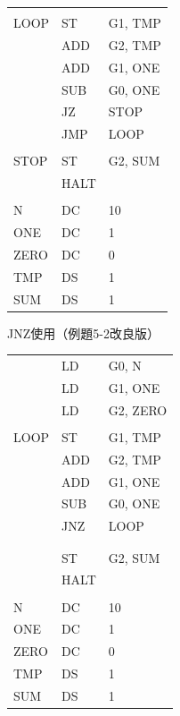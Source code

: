 \documentclass[handout]{beamer}        %
\begin{document}
\begin{frame}
\begin{minipage}{0.36\columnwidth}
{\begin{tabular}{|l|l|l|}
              &        &          \\
      LOOP    & ST     & G1, TMP  \\
              & ADD    & G2, TMP  \\
              & ADD    & G1, ONE  \\
              & SUB    & G0, ONE  \\
              & JZ     & STOP     \\
              & JMP    & LOOP     \\
              &        &          \\
      STOP    & ST     & G2, SUM  \\
              & HALT   &          \\
              &        &          \\
      N       & DC     & 10       \\
      ONE     & DC     & 1        \\
      ZERO    & DC     & 0        \\
      TMP     & DS     & 1        \\
      SUM     & DS     & 1        \\
    \end{tabular}}
  \end{minipage}
  \begin{minipage}{0.36\columnwidth}
    {\ttfamily JNZ使用（例題5-2改良版）\\\scriptsize
      \begin{tabular}{|l|l|l|}
              & LD     & G0, N    \\
              & LD     & G1, ONE  \\
              & LD     & G2, ZERO \\
              &        &          \\
      LOOP    & ST     & G1, TMP  \\
              & ADD    & G2, TMP  \\
              & ADD    & G1, ONE  \\
              & SUB    & G0, ONE  \\
              & JNZ    & LOOP     \\
              &        &          \\
              &        &          \\
              & ST     & G2, SUM  \\
              & HALT   &          \\
              &        &          \\
      N       & DC     & 10       \\
      ONE     & DC     & 1        \\
      ZERO    & DC     & 0        \\
      TMP     & DS     & 1        \\
      SUM     & DS     & 1        \\
    \end{tabular}}
  \end{minipage}
  \vfill
\end{frame}
\end{document}
